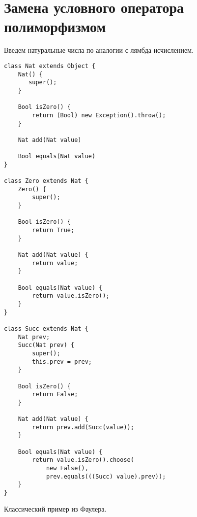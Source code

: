 \section{Замена условного оператора полиморфизмом}
Введем натуральные числа по аналогии с лямбда-исчислением.
\begin{lstlisting}[float=ht,label=nat,caption=Определение натуральных чисел]
class Nat extends Object {
    Nat() {
       super();
    }

    Bool isZero() {
        return (Bool) new Exception().throw();
    }

    Nat add(Nat value)

    Bool equals(Nat value)
}

class Zero extends Nat {
    Zero() {
        super();
    }

    Bool isZero() {
        return True;
    }

    Nat add(Nat value) {
        return value;
    }

    Bool equals(Nat value) {
        return value.isZero();
    }
}

class Succ extends Nat {
    Nat prev;
    Succ(Nat prev) {
        super();
        this.prev = prev;
    }

    Bool isZero() {
        return False;
    }

    Nat add(Nat value) {
        return prev.add(Succ(value));
    }

    Bool equals(Nat value) {
        return value.isZero().choose(
            new False(),
            prev.equals(((Succ) value).prev));
    }
}
\end{lstlisting}

Классический пример из Фаулера.

